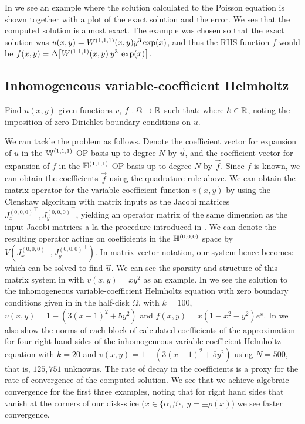 In  we see an example where the solution calculated to the Poisson equation is shown together with a plot of the exact solution and the error. We see that the computed solution is almost exact. The example was chosen so that the exact solution was $u(x,y) = W^{(1,1,1)} (x,y) y^3 \exp(x)$, and thus the RHS function $f$ would be $f(x,y) = \Delta \big[ W^{(1,1,1)}(x,y) \: y^3 \: \exp(x) \big]$.


\subsection{Inhomogeneous variable-coefficient Helmholtz}

Find $u(x,y)$ given functions $v$, $f : \Omega \to \mathbb{R}$ such that:
where $k \in \mathbb{R}$, noting the imposition of zero Dirichlet boundary conditions on $u$.

We can tackle the problem as follows. Denote the coefficient vector for expansion of $u$ in the ${\mathbb{W}^{(1,1,1)}}$ OP basis up to degree $N$ by $\vec{u}$, and the coefficient vector for expansion of $f$ in the ${\mathbb{H}^{(1,1,1)}}$ OP basis up to degree $N$ by $\vec{f}$. Since $f$ is known, we can obtain  the coefficients $\vec{f}$ using the quadrature rule above. We can obtain the matrix operator for the variable-coefficient function $v(x,y)$ by using the Clenshaw algorithm with matrix inputs as the Jacobi matrices ${J_x^{(0,0,0)}}^\top, {J_y^{(0,0,0)}}^\top$, yielding an operator matrix of the same dimension as the input Jacobi matrices a la the procedure introduced in \cite{olver2019triangle}. We can denote the resulting operator acting on coefficients in the ${\mathbb{H}^{(0,0,0)}}$ space by $V({J_x^{(0,0,0)}}^\top, {J_y^{(0,0,0)}}^\top)$. In matrix-vector notation, our system hence becomes:
which can be solved to find $\vec{u}$. We can see the sparsity and structure of this matrix system in  with $v(x,y) = xy^2$ as an example. In  we see the solution to the inhomogeneous variable-coefficient Helmholtz equation with zero boundary conditions given in  in the half-disk $\Omega$, with $k=100$, $v(x,y) = 1 - (3(x-1)^2 + 5y^2)$ and $f(x,y) = x(1-x^2-y^2)e^x$. In  we also show the norms of each block of calculated coefficients of the approximation for four right-hand sides of the inhomogeneous variable-coefficient Helmholtz equation with $k=20$ and $v(x,y) = 1 - (3(x-1)^2 + 5y^2)$ using $N = 500$, that is, $125,751$ unknowns. The rate of decay in the coefficients is a proxy for the rate of convergence of the computed solution. We see that we achieve algebraic convergence for the first three examples, noting that for right hand sides that vanish at the corners of our disk-slice ($x\in\{\alpha,\beta\}, \: y = \pm \rho(x)$) we see faster convergence.


